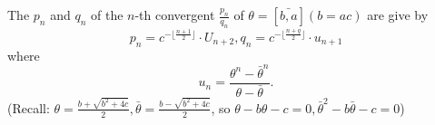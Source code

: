 \documentclass[NumTh.tex]{subfiles}
\begin{document}
\begin{theorem}
  The $p_n$ and $q_n$ of the $n$-th convergent $\frac{p_n}{q_n}$ of $\theta = [\bar{b,a}] (b = ac)$ are give by
  \[ p_n = c^{-\lfloor\frac{n+1}{2} \rfloor} \cdot U_{n+2}, q_n =c^{-\lfloor\frac{n+q}{2} \rfloor} \cdot u_{n+1}\]
  where
  \[ u_n = \frac{\theta^n - \bar{\theta}^n}{\theta - \bar{\theta}}.\]
  (Recall: $\theta = \frac{b+\sqrt{b^2+4c}}{2}, \bar{\theta} = \frac{b-\sqrt{b^2+4c}}{2}$, so $\theta - b\theta -c =0, \bar{\theta}^2 - b \bar{\theta} -c = 0$)
\end{theorem}
\end{document}
